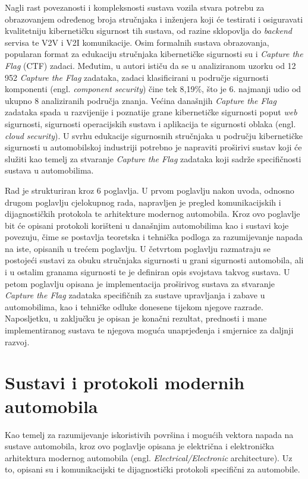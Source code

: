 \documentclass[times, utf8, diplomski, numeric]{fer}
\begin{document}
Nagli rast povezanosti i kompleksnosti sustava vozila stvara potrebu za obrazovanjem određenog broja stručnjaka i inženjera koji će testirati i osiguravati kvalitetniju kibernetičku sigurnost tih sustava, od razine sklopovlja do \textit{backend} servisa te V2V i V2I komunikacije. Osim formalnih sustava obrazovanja, popularan format za edukaciju stručnjaka kibernetičke sigurnosti su i \textit{Capture the Flag} (CTF) zadaci. Međutim, u \cite{vsvabensky2021cybersecurity} autori ističu da se u analiziranom uzorku od 12 952 \textit{Capture the Flag} zadataka, zadaci klasificirani u područje sigurnosti komponenti (engl. \textit{component security}) čine tek 8,19\%, što je 6. najmanji udio od ukupno 8 analiziranih područja znanja. Većina današnjih \textit{Capture the Flag} zadataka spada u razvijenije i poznatije grane kibernetičke sigurnosti poput \textit{web} sigurnosti, sigurnosti operacijskih sustava i aplikacija te sigurnosti oblaka (engl. \textit{cloud security})\cite{prinetto2020hardware}. U svrhu edukacije sigurnosnih stručnjaka u području kibernetičke sigurnosti u automobilskoj industriji potrebno je napraviti proširivi sustav koji će služiti kao temelj za stvaranje \textit{Capture the Flag} zadataka koji sadrže specifičnosti sustava u automobilima.

Rad je strukturiran kroz 6 poglavlja. U prvom poglavlju nakon uvoda, odnosno drugom poglavlju cjelokupnog rada, napravljen je pregled komunikacijskih i dijagnostičkih protokola te arhitekture modernog automobila. Kroz ovo poglavlje bit će opisani protokoli korišteni u današnjim automobilima kao i sustavi koje povezuju, čime se postavlja teoretska i tehnička podloga za razumijevanje napada na iste, opisanih u trećem poglavlju. U četvrtom poglavlju razmatraju se postojeći sustavi za obuku stručnjaka sigurnosti u grani sigurnosti automobila, ali i u ostalim granama sigurnosti te je definiran opis svojstava takvog sustava. U petom poglavlju opisana je implementacija proširivog sustava za stvaranje \textit{Capture the Flag} zadataka specifičnih za sustave upravljanja i zabave u automobilima, kao i tehničke odluke donesene tijekom njegove razrade. Naposljetku, u zaključku je opisan je konačni rezultat, prednosti i mane implementiranog sustava te njegova moguća unaprjeđenja i smjernice za daljnji razvoj.

\chapter{Sustavi i protokoli modernih automobila}
Kao temelj za razumijevanje iskoristivih površina i mogućih vektora napada na sustave automobila, kroz ovo poglavlje opisana je električna i elektronička arhitektura modernog automobila (engl. \textit{Electrical/Electronic} architecture). Uz to, opisani su i komunikacijski te dijagnostički protokoli specifični za automobile.
\end{document}
